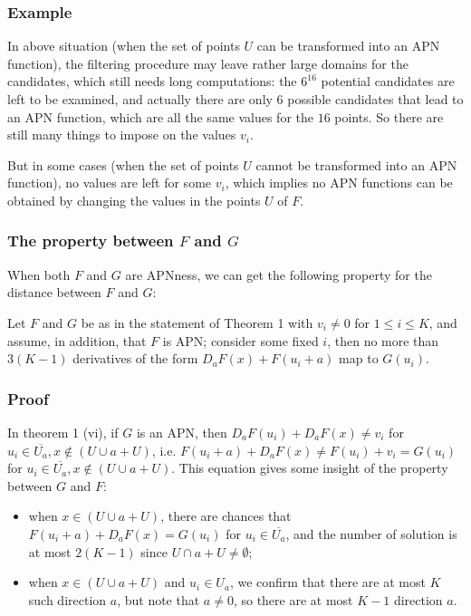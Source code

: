 \documentclass[
    aspectratio=169,                   %
]{beamer}
\begin{document}
    \begin{frame}
        \frametitle{Example}
    
        In above situation (when the set of points $U$ can be transformed into an APN function), the filtering procedure
        may leave rather large domains for the candidates, which still needs long computations: the $ 6^{16} $ potential candidates are left to be examined, 
        and actually there are only $ 6 $ possible candidates that lead to an APN function, which are all the same values for the $ 16 $ points.
        So there are still many things to impose on the values $ v_i $. 

        But in some cases (when the set of points $ U $ cannot be transformed into an APN function), no values are left for some $ v_i $, which implies no APN
        functions can be obtained by changing the values in the points $ U $ of $ F $.
    \end{frame}

    \begin{frame}
        \frametitle{The property between $ F $ and $ G $}
    
        When both $ F $ and $ G $ are APNness, we can get the following property for the distance between $ F $ and $ G $:
        \begin{corollary}
            Let $F$ and $G$ be as in the statement of Theorem 1 with $v_i \neq 0$ for $1\leq i \leq K$, and assume, in addition, that $F$ is APN;
            consider some fixed $ i $, then no more than $3(K−1)$ derivatives of the form $D_a F(x)+F(u_i+a)$ map to $G(u_i)$. 
        \end{corollary}
    
    \end{frame}

    \begin{frame}
        \frametitle{Proof}
        
        In theorem 1 (vi), if $ G $ is an APN, then $ D_aF(u_i)+D_aF(x)\neq v_i $ for $ u_i\in\overline{U_a},x\notin(U\cup a+U) $, 
        i.e. $ F(u_i+a)+D_aF(x)\neq F(u_i)+v_i=G(u_i) $ for $ u_i\in\overline{U_a},x\notin(U\cup a+U) $. This equation gives some insight of 
        the property between $ G $ and $ F $:
        \begin{itemize}
            \item when $ x\in(U\cup a+U) $,  there are chances that $ F(u_i+a)+D_aF(x)=G(u_i) $ for $ u_i\in\overline{U_a} $, 
            and the number of solution is at most $ 2(K-1) $ since $ U\cap a+U\neq\emptyset $;
            \item when $ x\in(U\cup a+U) $ and $ u_i\in U_a $, we confirm that there are at most $ K $ such direction $ a $, but note that 
            $ a\neq 0 $, so there are at most $ K-1 $ direction $ a $.
        \end{itemize}
    \end{frame}
\end{document}
